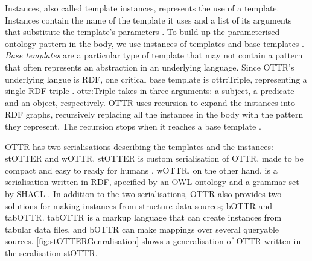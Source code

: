 \para
Instances, also called template instances, represents the use of a template.  Instances contain the name of the template it uses and a list of its arguments that substitute the template's parameters \autocite[3]{SLKK_OTTR_2021}. To build up the parameterised ontology pattern in the body, we use instances of templates and base templates \autocite[479]{SLKF_OTTR_2018}. \emph{Base templates} are a particular type of template that may not contain a pattern that often represents an abstraction in an underlying language. Since OTTR's underlying langue is RDF, one critical base template is ottr:Triple, representing a single RDF triple \autocite[4]{SLKK_OTTR_2021}. ottr:Triple takes in three arguments: a subject, a predicate and an object, respectively. OTTR uses recursion to expand the instances into RDF graphs, recursively replacing all the instances in the body with the pattern they represent. The recursion stops when it reaches a base template \autocite[479]{SLKF_OTTR_2018}.

\para
OTTR has two serialisations describing the templates and the instances: stOTTER and wOTTR. stOTTER is custom serialisation of OTTR, made to be compact and easy to ready for humans \autocite[4]{SLKK_OTTR_2021}. wOTTR, on the other hand, is a serialisation written in RDF, specified by an OWL ontology and a grammar set by SHACL \autocite{SHACL} \autocite[4]{SLKK_OTTR_2021}. In addition to the two serialisations, OTTR also provides two solutions for making instances from structure data sources; bOTTR and tabOTTR. tabOTTR is a markup language that can create instances from tabular data files, and bOTTR can make mappings over several queryable sources\autocite[16]{SLKK_OTTR_2021}. \autoref{fig:stOTTERGenralisation} shows a generalisation of OTTR written in the seralisation stOTTR.

